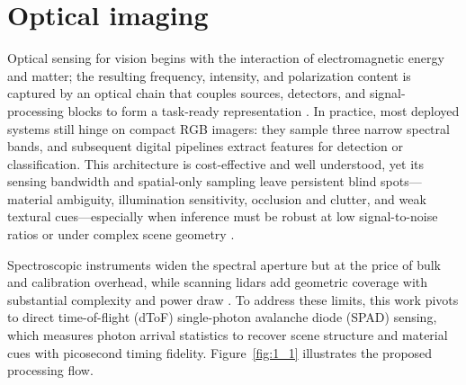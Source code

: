 \documentclass[12pt,a4paper,oneside]{report}
\let\oldsection\section
\renewcommand{\section}{\clearpage\oldsection}
\begin{document}
\section{Optical imaging}
\label{sec:optical_imaging}

Optical sensing for vision begins with the interaction of electromagnetic energy and matter; the resulting frequency, intensity, and polarization content is captured by an optical chain that couples sources, detectors, and signal-processing blocks to form a task-ready representation \cite{elachi2021,bass2010,schott2007}. In practice, most deployed systems still hinge on compact RGB imagers: they sample three narrow spectral bands, and subsequent digital pipelines extract features for detection or classification. This architecture is cost-effective and well understood, yet its sensing bandwidth and spatial-only sampling leave persistent blind spots—material ambiguity, illumination sensitivity, occlusion and clutter, and weak textural cues—especially when inference must be robust at low signal-to-noise ratios or under complex scene geometry \cite{sharan2013,schwartz2013}.

Spectroscopic instruments widen the spectral aperture but at the price of bulk and calibration overhead, while scanning lidars add geometric coverage with substantial complexity and power draw \cite{inagaki2020,becker2023}. To address these limits, this work pivots to direct time-of-flight (dToF) single-photon avalanche diode (SPAD) sensing, which measures photon arrival statistics to recover scene structure and material cues with picosecond timing fidelity. Figure~\ref{fig:1_1} illustrates the proposed processing flow.
\end{document}
